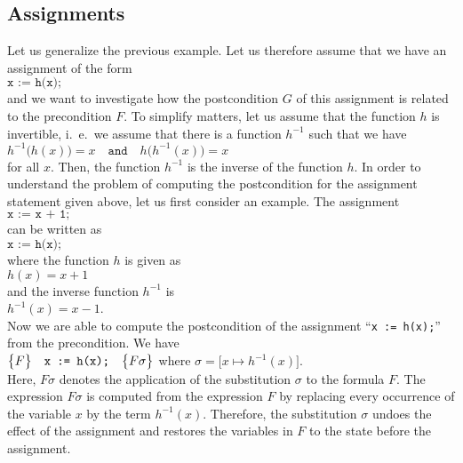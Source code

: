 \subsection{Assignments}
Let us generalize the previous example.  Let us therefore assume that we have an assignment of the
form 
\\[0.2cm]
\hspace*{1.3cm}
$ \texttt{x := h(x);} $
\\[0.2cm]
and we want to investigate how the postcondition $G$ of this assignment is related to the
precondition $F$.  To simplify matters, let us assume that the function
$h$ is invertible, i.~e.~we assume that there is a function $h^{-1}$ such that we have
\\[0.2cm]
\hspace*{1.3cm}
$ h^{-1}\bigl(h(x)\bigr) = x \quad \mathtt{and} \quad h\bigl(h^{-1}(x)\bigr) = x $
\\[0.2cm]
for all $x$.  Then, the function $h^{-1}$ is the inverse of the function $h$.
In order to understand the problem of computing the postcondition for the assignment statement given
above, let us first consider an example.  The assignment
\\[0.2cm]
\hspace*{1.3cm}
$ \texttt{x := x + 1;} $
\\[0.2cm]
can be written as
\\[0.2cm]
\hspace*{1.3cm}
$ \texttt{x := h(x);} $
\\[0.2cm]
where the function $h$ is given as
\\[0.2cm]
\hspace*{1.3cm}
$ h(x) = x + 1 $
\\[0.2cm]
and the inverse function $h^{-1}$ is 
\\[0.2cm]
\hspace*{1.3cm}
$h^{-1}(x) = x - 1$. 
\\[0.2cm]
Now we are able to compute the postcondition of the assignment ``\texttt{x := h(x);}'' from the
precondition.  We have
\\[0.2cm]
\hspace*{1.3cm}
$\bigl\{F\bigr\}\quad\texttt{x := h(x);}\quad\bigl\{F\sigma\bigr\}$ \quad where \quad 
$\sigma = \bigl[x \mapsto h^{-1}(x)\bigr]$.
\\[0.2cm]
Here, $F\sigma$ denotes the application of the substitution $\sigma$ to the formula $F$.  The
expression  $F\sigma$ is computed from the expression $F$ by replacing every occurrence of the variable
$x$ by the term $h^{-1}(x)$.  Therefore, the substitution $\sigma$ undoes the effect of the
assignment and restores the variables in $F$ to the state before the assignment.

